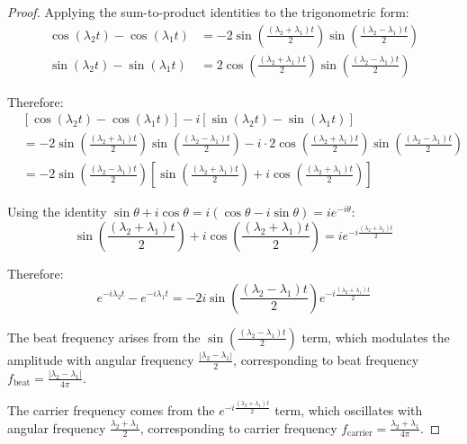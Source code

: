 \documentclass[12pt]{article}
\begin{document}
\begin{proof}
Applying the sum-to-product identities to the trigonometric form:
\begin{align}
\cos(\lambda_2 t) - \cos(\lambda_1 t) &= -2\sin\left(\frac{(\lambda_2 + \lambda_1)t}{2}\right)\sin\left(\frac{(\lambda_2 - \lambda_1)t}{2}\right)\\
\sin(\lambda_2 t) - \sin(\lambda_1 t) &= 2\cos\left(\frac{(\lambda_2 + \lambda_1)t}{2}\right)\sin\left(\frac{(\lambda_2 - \lambda_1)t}{2}\right)
\end{align}

Therefore:
\begin{align}
&[\cos(\lambda_2 t) - \cos(\lambda_1 t)] - i[\sin(\lambda_2 t) - \sin(\lambda_1 t)]\\
&= -2\sin\left(\frac{(\lambda_2 + \lambda_1)t}{2}\right)\sin\left(\frac{(\lambda_2 - \lambda_1)t}{2}\right) - i \cdot 2\cos\left(\frac{(\lambda_2 + \lambda_1)t}{2}\right)\sin\left(\frac{(\lambda_2 - \lambda_1)t}{2}\right)\\
&= -2\sin\left(\frac{(\lambda_2 - \lambda_1)t}{2}\right)\left[\sin\left(\frac{(\lambda_2 + \lambda_1)t}{2}\right) + i\cos\left(\frac{(\lambda_2 + \lambda_1)t}{2}\right)\right]
\end{align}

Using the identity $\sin\theta + i\cos\theta = i(\cos\theta - i\sin\theta) = ie^{-i\theta}$:
\begin{equation}
\sin\left(\frac{(\lambda_2 + \lambda_1)t}{2}\right) + i\cos\left(\frac{(\lambda_2 + \lambda_1)t}{2}\right) = ie^{-i\frac{(\lambda_2 + \lambda_1)t}{2}}
\end{equation}

Therefore:
\begin{equation}
e^{-i\lambda_2 t} - e^{-i\lambda_1 t} = -2i \sin\left(\frac{(\lambda_2 - \lambda_1)t}{2}\right) e^{-i\frac{(\lambda_2 + \lambda_1)t}{2}}
\end{equation}

The beat frequency arises from the $\sin\left(\frac{(\lambda_2 - \lambda_1)t}{2}\right)$ term, which modulates the amplitude with angular frequency $\frac{|\lambda_2 - \lambda_1|}{2}$, corresponding to beat frequency $f_{\text{beat}} = \frac{|\lambda_2 - \lambda_1|}{4\pi}$.

The carrier frequency comes from the $e^{-i\frac{(\lambda_2 + \lambda_1)t}{2}}$ term, which oscillates with angular frequency $\frac{\lambda_2 + \lambda_1}{2}$, corresponding to carrier frequency $f_{\text{carrier}} = \frac{\lambda_2 + \lambda_1}{4\pi}$.
\end{proof}
\end{document}
